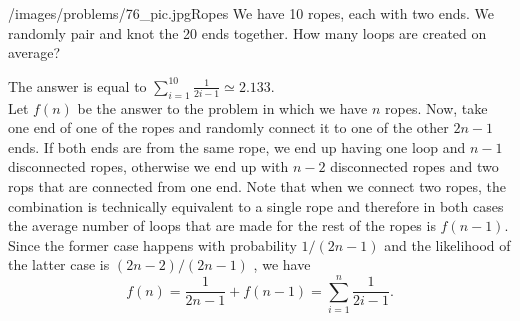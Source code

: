 \begin{problem}{/images/problems/76_pic.jpg}{Ropes} We have 10 ropes, each with two ends. We randomly pair and knot the 20 ends together. How many loops are created on average?
\end{problem}

\begin{solution}
The answer is equal to $\sum_{i=1}^{10} \frac{1}{2i-1} \simeq 2.133$.\\[0.2cm]

Let $f(n)$ be the answer to the problem in which we have $n$ ropes. Now, take one end of one of the ropes and randomly connect it to one of the other $2n-1$ ends. If both ends are from the same rope, we end up having one loop and $n-1$ disconnected ropes, otherwise we end up with $n-2$ disconnected ropes and two rops that are connected from one end. Note that when we connect two ropes, the combination is technically equivalent to a single rope and therefore in both cases the average number of loops that are made for the rest of the ropes is $f(n-1)$. Since the former case happens with probability $1/(2n-1)$ and the likelihood of the latter case is $(2n-2)/(2n-1)$ , we have $$f(n) = \frac{1}{2n-1} + f(n-1) = \sum_{i=1}^{n} \frac{1}{2i-1}.$$

\end{solution}

